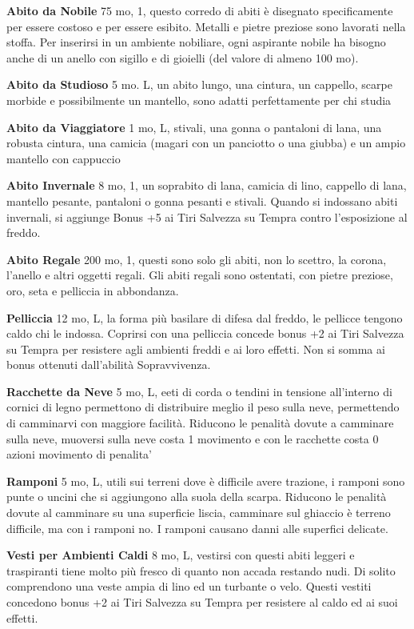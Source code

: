 \documentclass[a4paper,11pt,twoside,openany]{book}
\begin{document}
{\textbf{Abito da Nobile} 75 mo, 1, questo corredo di abiti è disegnato specificamente per essere costoso e per essere esibito. Metalli e pietre preziose sono lavorati nella stoffa. Per inserirsi in un ambiente nobiliare, ogni aspirante nobile ha bisogno anche di un anello con sigillo e di gioielli (del valore di almeno 100 mo).

\textbf{Abito da Studioso} 5 mo. L, un abito lungo, una cintura, un cappello, scarpe morbide e possibilmente un mantello, sono adatti perfettamente per chi studia

\textbf{Abito da Viaggiatore} 1 mo, L, stivali, una gonna o pantaloni di lana, una robusta cintura, una camicia (magari con un panciotto o una giubba) e un ampio mantello con cappuccio

\textbf{Abito Invernale} 8 mo, 1, un soprabito di lana, camicia di lino, cappello di lana, mantello pesante, pantaloni o gonna pesanti e stivali. Quando si indossano abiti invernali, si aggiunge Bonus +5 ai Tiri Salvezza su Tempra contro l'esposizione al freddo.

\textbf{Abito Regale} 200 mo, 1,  questi sono solo gli abiti, non lo scettro, la corona, l'anello e altri oggetti regali. Gli abiti regali sono ostentati, con pietre preziose, oro, seta e pelliccia in abbondanza.

\textbf{Pelliccia} 12 mo, L, la forma più basilare di difesa dal freddo, le pellicce tengono caldo chi le indossa. Coprirsi con una pelliccia concede bonus +2 ai Tiri Salvezza su Tempra per resistere agli ambienti freddi e ai loro effetti. Non si somma ai bonus ottenuti dall'abilità Sopravvivenza.

\textbf{Racchette da Neve} 5 mo, L, eeti di corda o tendini in tensione all'interno di cornici di legno permettono di distribuire meglio il peso sulla neve, permettendo di camminarvi con maggiore facilità. Riducono le penalità dovute a camminare sulla neve, muoversi sulla neve costa 1 movimento e con le racchette costa 0 azioni movimento di penalita'

\textbf{Ramponi} 5 mo, L, utili sui terreni dove è difficile avere trazione, i ramponi sono punte o uncini che si aggiungono alla suola della scarpa. Riducono le penalità dovute al camminare su una superficie liscia, camminare sul ghiaccio è terreno difficile, ma con i ramponi no. I ramponi causano danni alle superfici delicate.

\textbf{Vesti per Ambienti Caldi} 8 mo, L, vestirsi con questi abiti leggeri e traspiranti tiene molto più fresco di quanto non accada restando nudi. Di solito comprendono una veste ampia di lino ed un turbante o velo. Questi vestiti concedono bonus +2 ai Tiri Salvezza su Tempra per resistere al caldo ed ai suoi effetti. 

}
\end{document}
